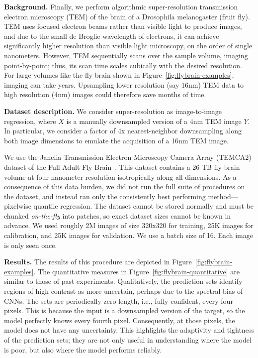 \documentclass[10pt]{article}
\begin{document}
\noindent\textbf{Background.} Finally, we perform algorithmic super-resolution transmission electron microscopy (TEM) of the brain of a Drosophila melanogaster (fruit fly).
TEM uses focused electron beams rather than visible light to produce images, and due to the small de Broglie wavelength of electrons, it can achieve significantly higher resolution than visible light microscopy, on the order of single nanometers.
However, TEM sequentially scans over the sample volume, imaging point-by-point; thus, its scan time scales cubically with the desired resolution. For large volumes like the fly brain shown in Figure~\ref{fig:flybrain-examples}, imaging can take years.
Upsampling lower resolution (say 16nm) TEM data to high resolution (4nm) images could therefore save months of time.

\noindent\textbf{Dataset description.} We consider super-resolution as image-to-image regression, where $X$ is a manually downsampled version of a 4nm TEM image $Y$. In particular, we consider a factor of 4x nearest-neighbor downsampling along both image dimensions to emulate the acquisition of a 16nm TEM image.

We use the Janelia Transmission Electron Microscopy Camera Array (TEMCA2) dataset of the Full Adult Fly Brain~\cite{zheng2018complete}. This dataset contains a 26 TB fly brain volume at four nanometer resolution isotropically along all dimensions. As a consequence of this data burden, we did not run the full suite of procedures on the dataset, and instead ran only the consistently best performing method---pixelwise quantile regression.
The dataset cannot be stored normally and must be chunked \emph{on-the-fly} into patches, so exact dataset sizes cannot be known in advance. We used roughly 2M images of size 320x320 for training, 25K images for calibration, and 25K images for validation.
We use a batch size of 16.
Each image is only seen once.

\noindent\textbf{Results.} The results of this procedure are depicted in Figure~\ref{fig:flybrain-examples}.
The quantitative measures in Figure~\ref{fig:flybrain-quantitative} are similar to those of past experiments. 
Qualitatively, the prediction sets identify regions of high contrast as more uncertain, perhaps due to the spectral bias of CNNs.
The sets are periodically zero-length, i.e., fully confident, every four pixels. 
This is because the input is a downsampled version of the target, so the model perfectly knows every fourth pixel.
Consequently, at those pixels, the model does not have any uncertainty. 
This highlights the adaptivity and tightness of the prediction sets; they are not only useful in understanding where the model is poor, but also where the model performs reliably.
\end{document}
